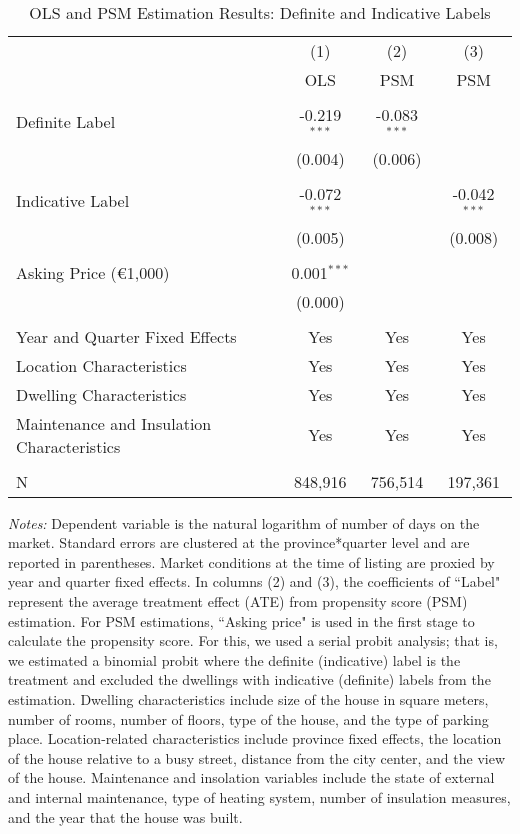 \documentclass[12pt]{article}
\begin{document}
\clearpage
\newpage
\begin{table}[H]
\footnotesize
  \centering
  \caption{OLS and PSM Estimation Results: Definite and Indicative Labels }
      \begin{tabular}{lccc}
\hline
                &\multicolumn{1}{c}{(1)}&\multicolumn{1}{c}{(2)}&\multicolumn{1}{c}{(3)}\\
&	OLS &	PSM&	PSM \\
\hline
&&&\\
Definite Label &	-0.219$^{***}$ & 	-0.083$^{***}$ & \\
& (0.004) & (0.006) & \\
&&&\\
Indicative Label &	-0.072$^{***}$ & & -0.042$^{***}$ \\
 & (0.005) & & (0.008) \\
&&&\\
Asking Price (\euro 1,000) &	0.001$^{***}$ & & \\
& (0.000) & & \\	
&&&\\
Year and Quarter Fixed Effects	& Yes &	Yes & Yes\\
Location Characteristics	& Yes &	Yes & Yes  \\
Dwelling Characteristics	& Yes &	Yes & Yes  \\
Maintenance and Insulation Characteristics	& Yes &	Yes & Yes  \\
&&&\\
N & 	848,916	& 756,514 &	197,361 \\
\hline

    \end{tabular}%
\begin{tablenotes}
\scriptsize
\item \textit{Notes:} Dependent variable is the natural logarithm of number of days on the market. Standard errors are clustered at the province*quarter level and are reported in parentheses. Market conditions at the time of listing are proxied by year and quarter fixed effects. In columns (2) and (3), the coefficients of ``Label" represent the average treatment effect (ATE) from propensity score (PSM) estimation. For PSM estimations, ``Asking price" is used in the first stage to calculate the propensity score. For this, we used a serial probit analysis; that is, we estimated a binomial probit where the definite (indicative) label is the treatment and excluded the dwellings with indicative (definite) labels from the estimation. Dwelling characteristics include size of the house in square meters, number of rooms, number of floors, type of the house, and the type of parking place. Location-related characteristics include province fixed effects, the location of the house relative to a busy street, distance from the city center, and the view of the house. Maintenance and insolation variables include the state of external and internal maintenance, type of heating system, number of insulation measures, and the year that the house was built. 
\end{tablenotes}

  \label{tab:addlabel}%
\end{table}%
\end{document}
